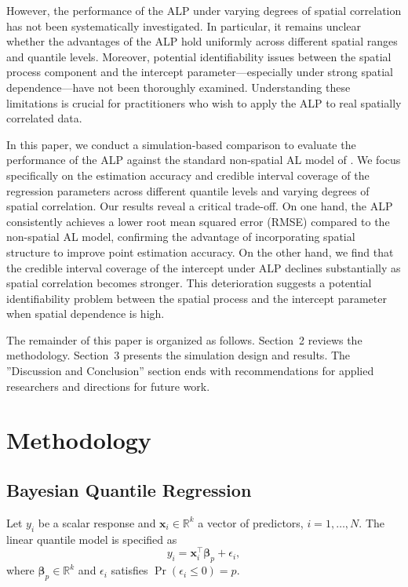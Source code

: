 \documentclass[twoside]{article}
\numberwithin{equation}{section}
\begin{document}
	However, the performance of the ALP under varying degrees of spatial correlation has not been systematically investigated. In particular, it remains unclear whether the advantages of the ALP hold uniformly across different spatial ranges and quantile levels. Moreover, potential identifiability issues between the spatial process component and the intercept parameter—especially under strong spatial dependence—have not been thoroughly examined. Understanding these limitations is crucial for practitioners who wish to apply the ALP to real spatially correlated data.
	
	In this paper, we conduct a simulation-based comparison to evaluate the performance of the ALP against the standard non-spatial AL model of \cite{KozumiKobayashi2011}. We focus specifically on the estimation accuracy and credible interval coverage of the regression parameters across different quantile levels and varying degrees of spatial correlation. Our results reveal a critical trade-off. On one hand, the ALP consistently achieves a lower root mean squared error (RMSE) compared to the non-spatial AL model, confirming the advantage of incorporating spatial structure to improve point estimation accuracy. On the other hand, we find that the credible interval coverage of the intercept under ALP declines substantially as spatial correlation becomes stronger. This deterioration suggests a potential identifiability problem between the spatial process and the intercept parameter when spatial dependence is high.
	
	The remainder of this paper is organized as follows. Section~2
	reviews the methodology. Section~3 presents the simulation design and
	results. The ''Discussion and Conclusion'' section ends with recommendations for applied researchers and directions for future work.
	
	\section{Methodology}
	
	\subsection{Bayesian Quantile Regression}
	
	Let $y_i$ be a scalar response and $\mathbf{x}_i \in \mathbb{R}^k$ a vector
	of predictors, $i = 1, \ldots, N$. The linear quantile model is
	specified as
	\begin{equation*}
		y_i = \mathbf{x}_i^\top \boldsymbol{\beta}_p + \epsilon_i,
	\end{equation*}
	where $\boldsymbol{\beta}_p \in \mathbb{R}^k$ and $\epsilon_i$ satisfies
	$\Pr(\epsilon_i \leq 0) = p$. 
	
\end{document}

